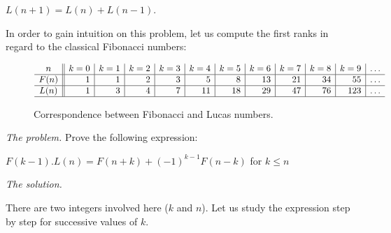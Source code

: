 $L(n+1) = L(n)+L(n-1)$.
\medskip

In order to gain intuition on this problem, let us compute the first ranks in regard to the classical Fibonacci numbers:
\begin{figure}[htb]
\[
\begin{array}{c||r|r|r|r|r|r|r|r|r|r|r}
{\displaystyle n } & k=0 & k=1 & k=2 & k=3 & k=4 & k=5 &
k=6 & k=7 & k=8 & k=9 & \ldots \\
\hline
F(n) & 1 & 1 &  2  &  3  &   5  &   8  &  13  &  21  & 34  & 55  & \ldots \\
\hline
L(n) & 1 & 3 &  4 &  7  &  11  &  18  &  29 & 47  & 76  & 123 & \ldots \\
\hline
\end{array}
\] 
\caption{Correspondence between Fibonacci and Lucas numbers.}
\label{fig:fiboLucas}
\end{figure}
%
%
%
\medskip

%
%
%
%
%

\noindent \textit{The problem.}
Prove the following expression:

$F(k-1).L(n) = F(n+k)+ (-1)^{k-1}F(n-k)$ for $k \leq n$
\bigskip

\noindent \textit{The solution.} 

There are two integers involved here ($k$ and $n$).
Let us study the expression step by step for successive values of $k$.
\medskip

